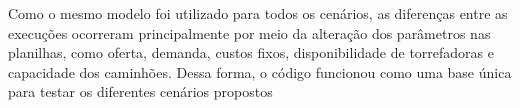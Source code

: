 \documentclass[a4paper,11pt]{article}
\begin{document}
Como o mesmo modelo foi utilizado para todos os cenários, as diferenças entre as execuções ocorreram principalmente por meio da alteração dos parâmetros nas planilhas, como oferta, demanda, custos fixos, disponibilidade de torrefadoras e capacidade dos caminhões. Dessa forma, o código funcionou como uma base única para testar os diferentes cenários propostos



\nocite{*}



\end{document}
